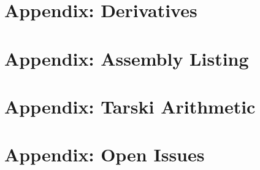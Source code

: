 \documentclass[cup9a]{cupbook}
\begin{document}

    
    \label{part:appendix}
    \chapter{Appendix: Derivatives}
    \chapter{Appendix: Assembly Listing}
    
    \chapter{Appendix: Tarski Arithmetic}
     
    
    \chapter{Appendix: Open Issues} %
    






\backmatter

\theendnotes


\end{document}
